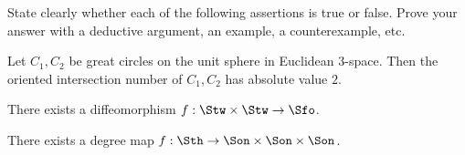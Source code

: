 State clearly whether each of the following assertions is true or
false. Prove your answer with a deductive argument, an example, a
counterexample, etc. 
\begin{alist}
\item Let $C_1, C_2$ be great circles on the unit sphere in Euclidean 
$3$-space. Then the oriented intersection number of $C_1,C_2$ has
absolute value $2$.
\item There exists a diffeomorphism $f:\Stw\times \Stw\rightarrow
\Sfo$.
\item There exists a degree map $f:\Sth \rightarrow \Son \times \Son
\times \Son$.
\end{alist}

